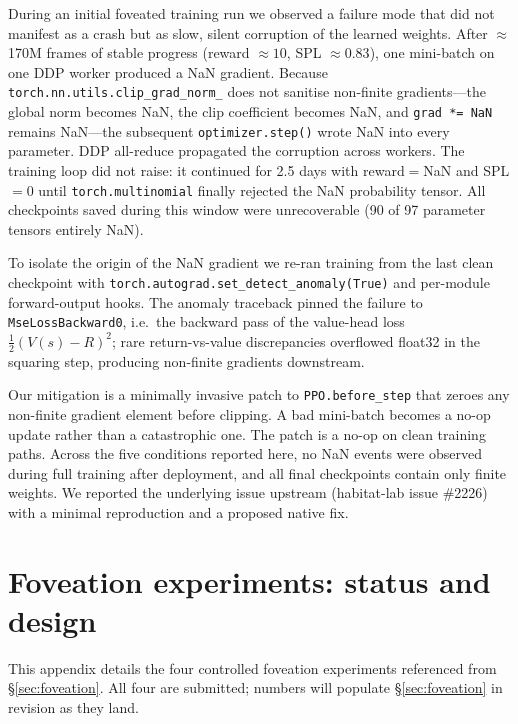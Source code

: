 \documentclass{article}
\begin{document}
During an initial foveated training run we observed a failure mode that did not manifest as a crash but as slow, silent corruption of the learned weights. After $\approx$170M frames of stable progress (reward $\approx 10$, SPL $\approx 0.83$), one mini-batch on one DDP worker produced a NaN gradient. Because \verb|torch.nn.utils.clip_grad_norm_| does not sanitise non-finite gradients---the global norm becomes NaN, the clip coefficient becomes NaN, and \verb|grad *= NaN| remains NaN---the subsequent \verb|optimizer.step()| wrote NaN into every parameter. DDP all-reduce propagated the corruption across workers. The training loop did not raise: it continued for 2.5 days with reward$=$NaN and SPL$=0$ until \verb|torch.multinomial| finally rejected the NaN probability tensor. All checkpoints saved during this window were unrecoverable (90 of 97 parameter tensors entirely NaN).

To isolate the origin of the NaN gradient we re-ran training from the last clean checkpoint with \verb|torch.autograd.set_detect_anomaly(True)| and per-module forward-output hooks. The anomaly traceback pinned the failure to \verb|MseLossBackward0|, i.e.\ the backward pass of the value-head loss $\tfrac{1}{2}(V(s) - R)^2$; rare return-vs-value discrepancies overflowed float32 in the squaring step, producing non-finite gradients downstream.

Our mitigation is a minimally invasive patch to \verb|PPO.before_step| that zeroes any non-finite gradient element before clipping. A bad mini-batch becomes a no-op update rather than a catastrophic one. The patch is a no-op on clean training paths. Across the five conditions reported here, no NaN events were observed during full training after deployment, and all final checkpoints contain only finite weights. We reported the underlying issue upstream (habitat-lab issue \#2226) with a minimal reproduction and a proposed native fix.


\section{Foveation experiments: status and design}
\label{app:foveation-status}

This appendix details the four controlled foveation experiments referenced from §\ref{sec:foveation}. All four are submitted; numbers will populate §\ref{sec:foveation} in revision as they land.
\end{document}
